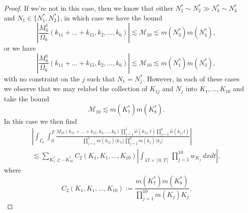\documentclass[12pt, letterpaper]{amsart}
\begin{document}
\begin{proof}
    If we're not in this case, then we know that either $N_1^*\sim N_2^*\gg N_3^*\sim N_4^*$ and $N_1 \in \{N_1^*, N_2^*\}$, in which case we have the bound
    \[
    \left|\frac{M^1_6}{\Omega_6}(k_{11}+\dots + k_{15}, k_2, \dots, k_6)\right|\lesssim \overline{\mathcal{M}_{10}}\lesssim m(N_3^*)m(N_4^*),
    \]
    or we have
    \[  
    \left|\frac{M^1_6}{\Omega_6}(k_{11}+\dots + k_{15}, k_2, \dots, k_6)\right|\lesssim \overline{\mathcal{M}_{10}}\lesssim m(N_1^*)m(N_3^*),
    \]
    with no constraint on the $j$ such that $N_1 = N_j^*$. However, in each of these cases we observe that we may relabel the collection of $K_{1j}$ and $N_j$ into $K_1, \dots, K_{10}$ and take the bound
    \[
    \overline{\mathcal{M}_{10}}\lesssim m(K_7^*)m(K_8^*).
    \]
    In this case we then find
    \begin{multline}\label{Equation: Better Case}
        \left|\int_{\Gamma_6}\int_0^T\frac{\overline{M_{10}}(k_{11}+\dots+k_{15},k_2,\dots,k_6)\prod_{j=1}^5\widehat{w}(k_{1j},t)\prod_{j=2}^6\widehat{w}(k_j,t)}{\prod_{j=1}^5m(k_{1j})\langle k_{1j}\rangle\prod_{j=2}^6m(k_j)\langle k_j\rangle}\right|\\
        \lesssim 
        \sum_{K_1^*\gtrsim \cdots K_{10}^*}C_2(K_1,K_1,\dots, K_{10})\left|\int_{\lambda\mathbb{T}\times [0,T]}\prod_{j=1}^{10}w_{K_j}\,dxdt\right|,
    \end{multline}
    where
    \[
        C_2(K_1,K_1,\dots, K_{10}) := \frac{m(K_{7}^*)m(K_{8}^*)}{\prod_{j=1}^{10}m(K_j)K_j}.
    \]


\end{proof}
\end{document}
